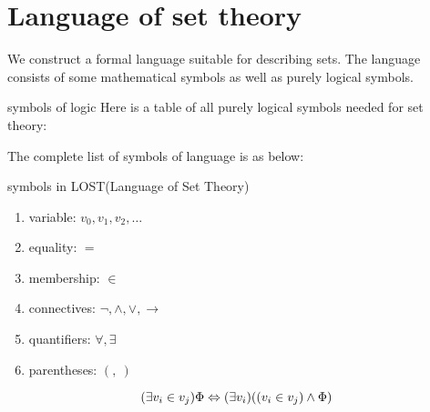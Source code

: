\section{Language of set theory}

We construct a formal language suitable for describing sets. The language consists of some mathematical symbols as well as purely logical symbols.

\begin{definition}{symbols of logic}{}
    Here is a table of all purely logical symbols needed for set theory:

\end{definition}

The complete list of symbols of language is as below:
\begin{definition}{symbols in LOST(Language of Set Theory)}{}
    \begin{enumerate}
        \item variable: $v_0, v_1, v_2, \ldots$
        \item equality: $=$
        \item membership: $\in$
        \item connectives: $\neg, \wedge, \vee, \rightarrow$
        \item quantifiers: $\forall, \exists$
        \item parentheses: $(,\ )$
    \end{enumerate}
\end{definition}

\begin{proposition}{}{}
    \[
        (\exists v_i \in v_j)\Phi \iff (\exists v_i)((v_i \in v_j)\wedge \Phi)\\
    \]
\end{proposition}

